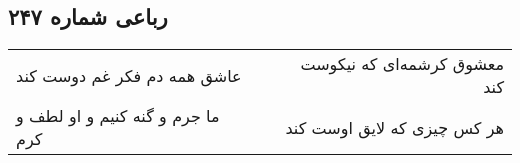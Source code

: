\begin{center}
\section*{رباعی شماره ۲۴۷}
\label{sec:sh247}
\begin{longtable}{l p{0.5cm} r}
عاشق همه دم فکر غم دوست کند
&&
معشوق کرشمه‌ای که نیکوست کند
\\
ما جرم و گنه کنیم و او لطف و کرم
&&
هر کس چیزی که لایق اوست کند
\\
\end{longtable}
\end{center}
